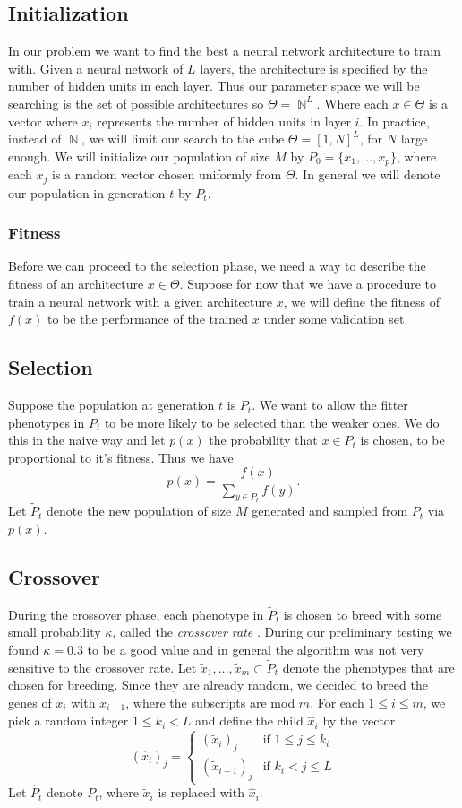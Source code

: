 \documentclass{article}
\DeclareMathOperator{\N}{\mathbb{N}}
\DeclareMathOperator{\1}{\mathbbm{1}}
\begin{document}
\subsection{Initialization}
In our problem we want to find the best a neural network architecture to train with. 
Given a neural network of $L$ layers, the architecture is specified by the number of hidden units in each layer. 
Thus our parameter space we will be searching is the set of possible architectures so $\Theta=\N^L$. 
Where each $x\in\Theta$ is a vector where $x_i$ represents the number of hidden units in layer $i$. 
In practice, instead of $\N$, we will limit our search to the cube $\Theta=[1,N]^L$, for $N$ large enough.
We will initialize our population of size $M$ by $P_0=\{x_1,\dots,x_p\}$, where each $x_j$ is a random vector chosen 
uniformly from $\Theta$. In general we will denote our population in generation $t$ by $P_t$.

\subsubsection{Fitness}
Before we can proceed to the selection phase, we need a way to describe the fitness of an architecture $x\in\Theta$.
Suppose for now that we have a procedure to train a neural network with a given architecture $x$, 
we will define the fitness of $f(x)$ to be the performance of the trained $x$ under some validation set. 


\subsection{Selection}
Suppose the population at generation $t$ is $P_t$. We want to allow the fitter phenotypes in $P_t$ to be more
likely to be selected than the weaker ones. We do this in the naive way and let $p(x)$ the probability that $x\in P_t$ is chosen,
to be proportional to it's fitness. Thus we have
\[p(x)=\frac{f(x)}{\sum_{y\in P_t}f(y)}.\]
Let $\tilde{P}_t$ denote the new population of size $M$ generated and sampled from $P_t$ via $p(x)$.

\subsection{Crossover}
During the crossover phase, each phenotype in $\tilde{P}_t$ is chosen to breed with some small probability $\kappa$,
called the \emph{crossover rate} . During our preliminary testing we found $\kappa=0.3$ to be a good value and in general the 
algorithm was not very sensitive to the crossover rate.
Let ${\tilde{x}_1,\dots,\tilde{x}_m}\subset \tilde{P}_t$ denote the phenotypes that are chosen for breeding.
Since they are already random, we decided to breed the genes of $\tilde{x}_i$ with $\tilde{x}_{i+1}$, where the subscripts are mod $m$.
For each $1\leq i\leq m$, we pick a random integer $1\leq k_i< L$ and define the child $\hat{x}_i$ by the vector
\[(\hat{x}_i )_j= \begin{cases} (\tilde{x}_i)_j &\mbox{if } 1\leq j\leq k_i \\ 
(\tilde{x}_{i+1})_j & \mbox{if } k_i<j\leq L \end{cases} \]
Let $\hat{P}_t$ denote $\tilde{P}_t$, where $\tilde{x}_i$ is replaced with $\hat{x}_i$.
\end{document}
